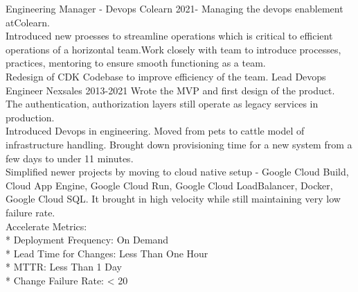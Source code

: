 \documentclass[11pt]{spidercv}
\begin{document}
    





    \begin{MainPart}

    \Experience
        {\ColorHighlight}
		{Engineering Manager - Devops}
		{Colearn}
        {2021-\faUndo}
        {   
            Managing the devops enablement atColearn.\\
            Introduced new proesses to streamline operations which is critical to efficient operations of a horizontal team.Work closely with team to introduce processes, practices, mentoring to ensure smooth functioning as a team. \\
            Redesign of CDK Codebase to improve efficiency of the team.
        }
    \Experience
        {\ColorHighlight}
		{Lead Devops Engineer}
		{Nexsales}
        {2013-2021}
        {  
        	Wrote the MVP and first design of the product. The authentication, authorization layers still operate as legacy services in production. \\ 
            Introduced Devops in engineering. Moved from pets to cattle model of infrastructure handling. Brought down provisioning time for a new system from a few days to under 11 minutes. \\
            Simplified newer projects by moving to cloud native setup - Google Cloud Build, Cloud App Engine, Google Cloud Run, Google Cloud LoadBalancer, Docker, Google Cloud SQL. It brought in high velocity while still maintaining very low failure rate.\\
            Accelerate Metrics: \\
            * Deployment Frequency: On Demand \\
            * Lead Time for Changes: Less Than One Hour \\
            * MTTR: Less Than 1 Day \\
            * Change Failure Rate: < 20%
        }


\end{MainPart}
\end{document}
